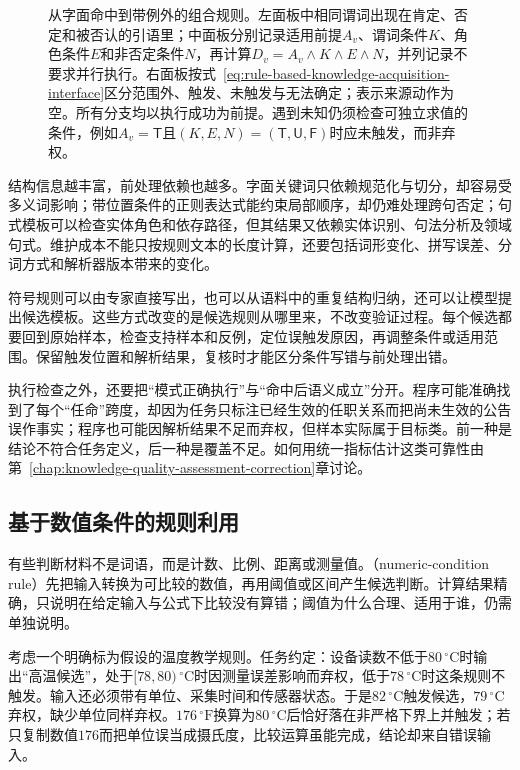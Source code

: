 \begin{figure}[htbp]
  \centering
  
  \caption{从字面命中到带例外的组合规则。左面板中相同谓词出现在肯定、否定和被否认的引语里；中面板分别记录适用前提$A_v$、谓词条件$K$、角色条件$E$和非否定条件$N$，再计算$D_v=A_v\land K\land E\land N$，并列记录不要求并行执行。右面板按式~\eqref{eq:rule-based-knowledge-acquisition-interface}区分范围外、触发、未触发与无法确定；\textemdash{}表示来源动作为空。所有分支均以执行成功为前提。遇到未知仍须检查可独立求值的条件，例如$A_v=\mathsf{T}$且$(K,E,N)=(\mathsf{T},\mathsf{U},\mathsf{F})$时应未触发，而非弃权。}
  \label{fig:rule-based-knowledge-acquisition-pattern-rule}
\end{figure}

结构信息越丰富，前处理依赖也越多。字面关键词只依赖规范化与切分，却容易受多义词影响；带位置条件的正则表达式能约束局部顺序，却仍难处理跨句否定；句式模板可以检查实体角色和依存路径，但其结果又依赖实体识别、句法分析及领域句式。维护成本不能只按规则文本的长度计算，还要包括词形变化、拼写误差、分词方式和解析器版本带来的变化。

符号规则可以由专家直接写出，也可以从语料中的重复结构归纳，还可以让模型提出候选模板。这些方式改变的是候选规则从哪里来，不改变验证过程。每个候选都要回到原始样本，检查支持样本和反例，定位误触发原因，再调整条件或适用范围。保留触发位置和解析结果，复核时才能区分条件写错与前处理出错。

执行检查之外，还要把“模式正确执行”与“命中后语义成立”分开。程序可能准确找到了每个“任命”跨度，却因为任务只标注已经生效的任职关系而把尚未生效的公告误作事实；程序也可能因解析结果不足而弃权，但样本实际属于目标类。前一种是结论不符合任务定义，后一种是覆盖不足。如何用统一指标估计这类可靠性由第~\ref{chap:knowledge-quality-assessment-correction}章讨论。

\subsection{基于数值条件的规则利用}
\label{sec:rule-based-knowledge-acquisition-numeric-pattern}

有些判断材料不是词语，而是计数、比例、距离或测量值。（numeric-condition rule）先把输入转换为可比较的数值，再用阈值或区间产生候选判断。计算结果精确，只说明在给定输入与公式下比较没有算错；阈值为什么合理、适用于谁，仍需单独说明。

考虑一个明确标为假设的温度教学规则。任务约定：设备读数不低于$80\,^\circ\mathrm{C}$时输出“高温候选”，处于$[78,80)\,^\circ\mathrm{C}$时因测量误差影响而弃权，低于$78\,^\circ\mathrm{C}$时这条规则不触发。输入还必须带有单位、采集时间和传感器状态。于是$82\,^\circ\mathrm{C}$触发候选，$79\,^\circ\mathrm{C}$弃权，缺少单位同样弃权。$176\,^\circ\mathrm{F}$换算为$80\,^\circ\mathrm{C}$后恰好落在非严格下界上并触发；若只复制数值$176$而把单位误当成摄氏度，比较运算虽能完成，结论却来自错误输入。

